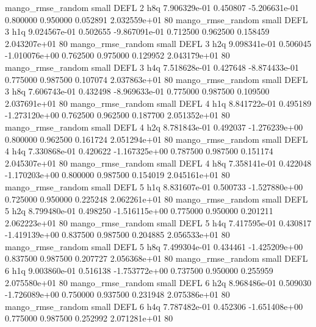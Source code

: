 mango_rmse_random      small     DEFL                 2                  h8q 7.906329e-01      0.450807 -5.206631e-01 0.800000 0.950000       0.052891 2.032559e+01 80
mango_rmse_random      small     DEFL                 3                  h1q 9.024567e-01      0.502655 -9.867091e-01 0.712500 0.962500       0.158459 2.043207e+01 80
mango_rmse_random      small     DEFL                 3                  h2q 9.098341e-01      0.506045 -1.010076e+00 0.762500 0.975000       0.129952 2.043179e+01 80
mango_rmse_random      small     DEFL                 3                  h4q 7.518628e-01      0.427648 -8.874433e-01 0.775000 0.987500       0.107074 2.037863e+01 80
mango_rmse_random      small     DEFL                 3                  h8q 7.606743e-01      0.432498 -8.969633e-01 0.775000 0.987500       0.109500 2.037691e+01 80
mango_rmse_random      small     DEFL                 4                  h1q 8.841722e-01      0.495189 -1.273120e+00 0.762500 0.962500       0.187700 2.051352e+01 80
mango_rmse_random      small     DEFL                 4                  h2q 8.781843e-01      0.492037 -1.276239e+00 0.800000 0.962500       0.161724 2.051294e+01 80
mango_rmse_random      small     DEFL                 4                  h4q 7.330868e-01      0.420622 -1.167325e+00 0.787500 0.987500       0.151174 2.045307e+01 80
mango_rmse_random      small     DEFL                 4                  h8q 7.358141e-01      0.422048 -1.170203e+00 0.800000 0.987500       0.154019 2.045161e+01 80
mango_rmse_random      small     DEFL                 5                  h1q 8.831607e-01      0.500733 -1.527880e+00 0.725000 0.950000       0.225248 2.062261e+01 80
mango_rmse_random      small     DEFL                 5                  h2q 8.799480e-01      0.498250 -1.516115e+00 0.775000 0.950000       0.201211 2.062223e+01 80
mango_rmse_random      small     DEFL                 5                  h4q 7.417595e-01      0.430817 -1.419139e+00 0.837500 0.987500       0.204885 2.056533e+01 80
mango_rmse_random      small     DEFL                 5                  h8q 7.499304e-01      0.434461 -1.425209e+00 0.837500 0.987500       0.207727 2.056368e+01 80
mango_rmse_random      small     DEFL                 6                  h1q 9.003860e-01      0.516138 -1.753772e+00 0.737500 0.950000       0.255959 2.075580e+01 80
mango_rmse_random      small     DEFL                 6                  h2q 8.968486e-01      0.509030 -1.726089e+00 0.750000 0.937500       0.231948 2.075386e+01 80
mango_rmse_random      small     DEFL                 6                  h4q 7.787482e-01      0.452306 -1.651408e+00 0.775000 0.987500       0.252992 2.071281e+01 80
